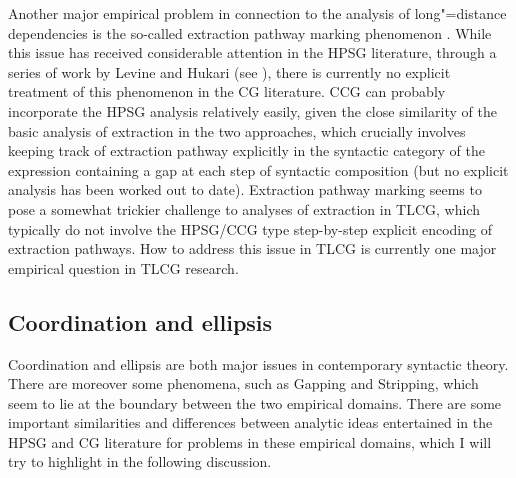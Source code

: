 \documentclass[output=paper]{langsci/langscibook}
\begin{document}
Another major empirical problem in connection to the analysis of
long"=distance dependencies is the so-called extraction pathway marking
phenomenon \citep{mccloskey79,Zaenen83a-u-kopiert}.  While
this issue has received considerable attention in the HPSG literature,
through a series of work by Levine and Hukari (see \citealt{LH2006a}), there
is currently no explicit treatment of this phenomenon in the CG
literature. CCG can probably incorporate the HPSG analysis relatively
easily, given the close similarity of the basic analysis of extraction
in the two approaches, which crucially involves keeping track of
extraction pathway explicitly in the syntactic category of the
expression containing a gap at each step of syntactic composition (but
no explicit analysis has been worked out to date). Extraction pathway
marking seems to pose a somewhat trickier challenge to analyses of
extraction in TLCG, which typically do not involve the HPSG/CCG type
step-by-step explicit encoding of extraction pathways. How to address
this issue in TLCG is currently one major empirical question in TLCG
research.





\subsection{Coordination and ellipsis}

Coordination and ellipsis are both major issues in contemporary
syntactic theory. There are moreover some phenomena, such as Gapping
and Stripping, which seem to lie at the boundary between the two
empirical domains. There are some important similarities and
differences between analytic ideas entertained in the HPSG and CG
literature for problems in these empirical domains, which I will try
to highlight in the following discussion.
\end{document}
